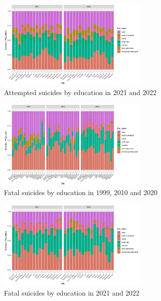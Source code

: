 \documentclass{article}
\begin{document}
\begin{figure}[H]
    \centering
    \includegraphics[width=0.65\textwidth]{imgs/education_city_att_suicides-2122.pdf}
    \caption{Attempted suicides by education  in 2021 and 2022}
    \label{fig:education_city_att_suicides-2122}
\end{figure}

\begin{figure}[H]
    \centering
    \includegraphics[width=0.65\textwidth]{imgs/education_city_fat_suicides-991020.pdf}
    \caption{Fatal suicides by education  in 1999, 2010 and 2020}
    \label{fig:education_city_fat_suicides-991020}
\end{figure}

\begin{figure}[H]
    \centering
    \includegraphics[width=0.65\textwidth]{imgs/education_city_fat_suicides-2122.pdf}
    \caption{Fatal suicides by education  in 2021 and 2022}
    \label{fig:education_city_fat_suicides-2122}
\end{figure}
\end{document}
